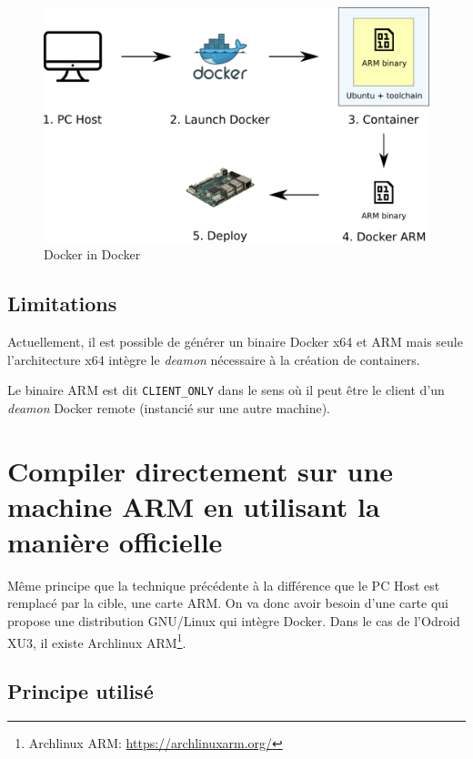 \documentclass[11pt,a4paper,oneside]{report}
\newcommand{\code}[1]{\texttt{#1}} %
\begin{document}
\begin{figure}
    \begin{center}
        \includegraphics[scale=0.6]{img/docker_in_docker}
    \end{center}
    \caption{Docker in Docker}
    \label{fig_docker_in_docker}
\end{figure}

\subsection{Limitations}\label{maniere_officielle_limitations}

Actuellement, il est possible de générer un binaire Docker x64 et ARM mais seule l'architecture x64 intègre le \emph{deamon} nécessaire à la création de containers.

Le binaire ARM est dit \code{CLIENT\_ONLY} dans le sens où il peut être le client d'un \emph{deamon} Docker remote (instancié sur une autre machine).


\section{Compiler directement sur une machine ARM en utilisant la manière officielle}

Même principe que la technique précédente à la différence que le PC Host est remplacé par la cible, une carte ARM. On va donc avoir besoin d'une carte qui propose une distribution GNU/Linux qui intègre Docker. Dans le cas de l'Odroid XU3, il existe Archlinux ARM\footnote{Archlinux ARM: \url{https://archlinuxarm.org/}}.

\subsection{Principe utilisé}
\end{document}
